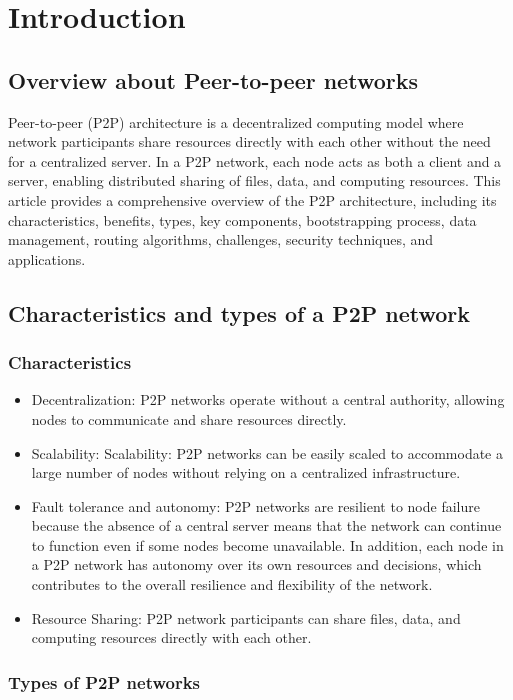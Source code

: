\section{Introduction}

\subsection{Overview about Peer-to-peer networks}
Peer-to-peer (P2P) architecture is a decentralized computing model where network participants share resources directly with each other without the need for a centralized server. In a P2P network, each node acts as both a client and a server, enabling distributed sharing of files, data, and computing resources. This article provides a comprehensive overview of the P2P architecture, including its characteristics, benefits, types, key components, bootstrapping process, data management, routing algorithms, challenges, security techniques, and applications.

\subsection{Characteristics and types of a P2P network}
\subsubsection{Characteristics}
\begin{itemize}
    \item Decentralization: P2P networks operate without a central authority, allowing nodes to communicate and share resources directly.
    \item Scalability: Scalability: P2P networks can be easily scaled to accommodate a large number of nodes without relying on a centralized infrastructure.
    \item Fault tolerance and autonomy: P2P networks are resilient to node failure because the absence of a central server means that the network can continue to function even if some nodes become unavailable. In addition, each node in a P2P network has autonomy over its own resources and decisions, which contributes to the overall resilience and flexibility of the network.
    \item Resource Sharing: P2P network participants can share files, data, and computing resources directly with each other.
\end{itemize}

\subsubsection{Types of P2P networks}

